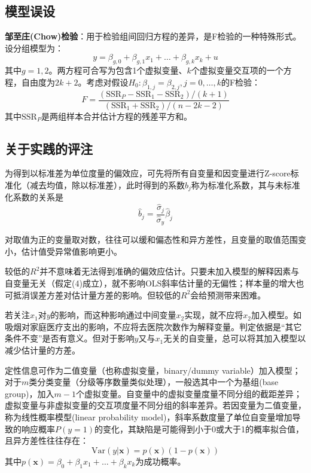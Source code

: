 \subsection{模型误设}

\par \textbf{邹至庄(Chow)检验}：用于检验组间回归方程的差异，是F检验的一种特殊形式。设分组模型为：
\begin{equation}
    y=\beta_{g,0}+\beta_{g,1}x_1+\dots+\beta_{g,k}x_k+u
\end{equation}
其中$g=1,2$。两方程可合写为包含1个虚拟变量、$k$个虚拟变量交互项的一个方程，自由度为$2k+2$。考虑对假设$H_0: \beta_{1,j}=\beta_{2,j},j=0,\dots,k$的F检验：
\begin{equation}
    F=\frac{(\text{SSR}_P-\text{SSR}_1-\text{SSR}_2)/(k+1)}{(\text{SSR}_1+\text{SSR}_2)/(n-2k-2)}
\end{equation}
其中$\text{SSR}_P$是两组样本合并估计方程的残差平方和。

\subsection{关于实践的评注}
\par 为得到以标准差为单位度量的偏效应，可先将所有自变量和因变量进行Z-score标准化（减去均值，除以标准差），此时得到的系数$\hat{b}_j$称为标准化系数，其与未标准化系数的关系是
\begin{equation}
    \hat{b}_j=\frac{\hat{\sigma}_j}{\hat{\sigma}_y}\hat{\beta}_j
\end{equation}

\par 对取值为正的变量取对数，往往可以缓和偏态性和异方差性，且变量的取值范围变小，估计值受异常值影响更小。

\par 较低的$R^2$并不意味着无法得到准确的偏效应估计。只要未加入模型的解释因素与自变量无关（假定(4)成立），就不影响OLS斜率估计量的无偏性；样本量的增大也可抵消误差方差对估计量方差的影响。但较低的$R^2$会给预测带来困难。

\par 若关注$x_1$对$y$的影响，而这种影响通过中间变量$x_2$实现，就不应将$x_2$加入模型。如吸烟对家庭医疗支出的影响，不应将去医院次数作为解释变量。判定依据是“其它条件不变”是否有意义。但对于影响$y$又与$x_1$无关的自变量，总可以将其加入模型以减少估计量的方差。

\par 定性信息可作为二值变量（也称虚拟变量，binary/dummy variable）加入模型；对于$m$类分类变量（分级等序数量类似处理），一般选其中一个为基组(base group)，加入$m-1$个虚拟变量。自变量中的虚拟变量度量不同分组的截距差异；虚拟变量与非虚拟变量的交互项度量不同分组的斜率差异。若因变量为二值变量，称为线性概率模型(linear probability model)，斜率系数度量了单位自变量增加导致的响应概率$P(y=1)$的变化，其缺陷是可能得到小于0或大于1的概率拟合值，且异方差性往往存在：
\begin{equation}
    \text{Var}(y\vert \textbf{x})=p(\textbf{x})(1-p(\textbf{x}))
\end{equation}
其中$p(\textbf{x})=\beta_0+\beta_1 x_1+\dots+\beta_kx_k$为成功概率。
